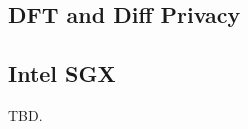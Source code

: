 \vspace{-.15in}\subsection{DFT and Diff Privacy}
\label{sec:dft}\vspace{-.075in}

% 

\vspace{-.15in}\subsection{Intel SGX}
\label{sec:sgx}\vspace{-.075in}

TBD.





